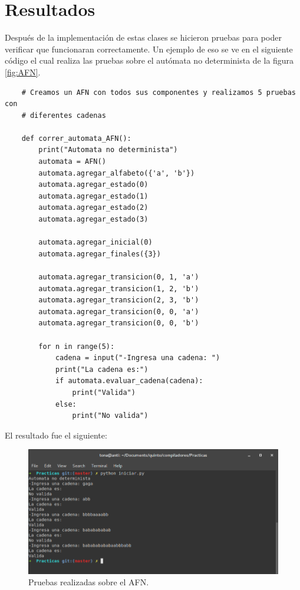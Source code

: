 \documentclass[titlepage]{article}
\begin{document}
	\section{Resultados}
	Después de la implementación de estas clases se hicieron pruebas para poder verificar que funcionaran correctamente. Un ejemplo de eso se ve en el siguiente código el cual realiza las pruebas sobre el autómata no determinista de la figura \ref{fig:AFN}.
	
	\begin{lstlisting}
	# Creamos un AFN con todos sus componentes y realizamos 5 pruebas con
	# diferentes cadenas
	
	def correr_automata_AFN():
		print("Automata no determinista")
		automata = AFN()
		automata.agregar_alfabeto({'a', 'b'})
		automata.agregar_estado(0)
		automata.agregar_estado(1)
		automata.agregar_estado(2)
		automata.agregar_estado(3)
		
		automata.agregar_inicial(0)
		automata.agregar_finales({3})
		
		automata.agregar_transicion(0, 1, 'a')
		automata.agregar_transicion(1, 2, 'b')
		automata.agregar_transicion(2, 3, 'b')
		automata.agregar_transicion(0, 0, 'a')
		automata.agregar_transicion(0, 0, 'b')
		
		for n in range(5):
			cadena = input("-Ingresa una cadena: ")
			print("La cadena es:")
			if automata.evaluar_cadena(cadena):
				print("Valida")
			else:
				print("No valida")
	\end{lstlisting}
	
	El resultado fue el siguiente:
	
	\begin{figure}[H]
		\begin{center}
			\includegraphics[width=12cm]{AFNprueba.png}
			\caption{Pruebas realizadas sobre el AFN.}
			\label{fig:AFN2}
		\end{center}
	\end{figure}
	
\end{document}
